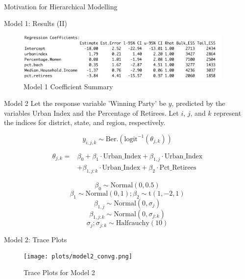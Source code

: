 \documentclass{beamer}
\begin{document}
\begin{frame}{Motivation for Hierarchical Modelling}
\begin{frame}{Model 1: Results (II)}
    \begin{center}
        \begin{figure}
            \caption{Model 1 Coefficient Summary}
            \includegraphics[width=0.95\textwidth]{plots/model1_summary_output.png}
        \end{figure}
    \end{center}
\end{frame}


\begin{frame}{Model 2}
    Let the response variable 'Winning Party' be \(y\), predicted by the variables Urban Index and the Percentage of Retirees. Let \(i\), \(j\), and \(k\) represent the indices for district, state, and region, respectively.

    \[
    y_{i,j,k} \sim \text{Ber.}\left(\text{logit}^{-1}(\theta_{j,k})\right)
    \]

\[
\begin{aligned}
\theta_{j,k} =    &\beta_0 + \beta_1 \cdot \text{Urban\_Index} + \beta_{1,j} \cdot \text{Urban\_Index} \\
    &+ \beta_{1,j:k} \cdot \text{Urban\_Index} + \beta_2 \cdot \text{Pct\_Retirees}
\end{aligned}
\]



    \[\beta_0 \sim \text{Normal}(0, 0.5)\]
    \[\beta_1 \sim \text{Normal}(0, 1); \beta_2 \sim \text{t}(1,-2,1)\]
    \[\beta_{1,j} \sim \text{Normal}(0, \sigma_j)\]
    \[\beta_{1,j:k} \sim \text{Normal}(0, \sigma_{j:k})\]
    \[ \sigma_j; \sigma_{j:k} \sim \text{Halfcauchy}(10)\]

    
\end{frame}

\begin{frame}{Model 2: Trace Plots}
    \begin{center}
        \begin{figure}
            \texttt{[image: plots/model2\_convg.png]}
            \caption{Trace Plots for Model 2}
        \end{figure}
    \end{center}
\end{frame}




\end{frame}
\end{document}
